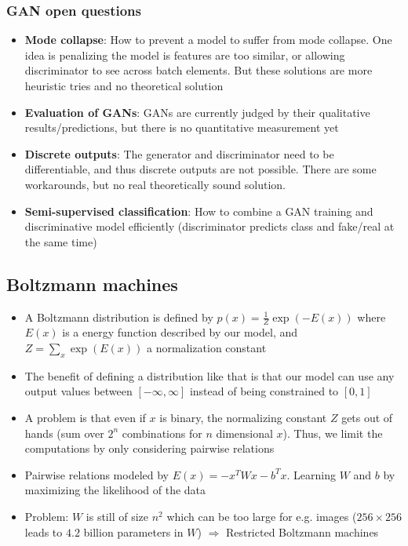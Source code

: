 \subsubsection{GAN open questions}
\begin{itemize}
	\item \textbf{Mode collapse}: How to prevent a model to suffer from mode collapse. One idea is penalizing the model is features are too similar, or allowing discriminator to see across batch elements. But these solutions are more heuristic tries and no theoretical solution
	\item \textbf{Evaluation of GANs}: GANs are currently judged by their qualitative results/predictions, but there is no quantitative measurement yet
	\item \textbf{Discrete outputs}: The generator and discriminator need to be differentiable, and thus discrete outputs are not possible. There are some workarounds, but no real theoretically sound solution.
	\item \textbf{Semi-supervised classification}: How to combine a GAN training and discriminative model efficiently (discriminator predicts class and fake/real at the same time)
\end{itemize}
\subsection{Boltzmann machines}
\begin{itemize}
	\item A Boltzmann distribution is defined by $p(x) = \frac{1}{Z}\exp\left(-E\left(x\right)\right)$ where $E(x)$ is a energy function described by our model, and $Z=\sum\limits_x \exp\left(E\left(x\right)\right)$ a normalization constant
	\item The benefit of defining a distribution like that is that our model can use any output values between $[-\infty, \infty]$ instead of being constrained to $[0,1]$
	\item A problem is that even if $x$ is binary, the normalizing constant $Z$ gets out of hands (sum over $2^{n}$ combinations for $n$ dimensional $x$). Thus, we limit the computations by only considering pairwise relations
	\item Pairwise relations modeled by $E(x)=-x^TWx-b^Tx$. Learning $W$ and $b$ by maximizing the likelihood of the data
	\item Problem: $W$ is still of size $n^2$ which can be too large for e.g. images ($256\times 256$ leads to $4.2$ billion parameters in $W$) $\Rightarrow$ Restricted Boltzmann machines
\end{itemize}
